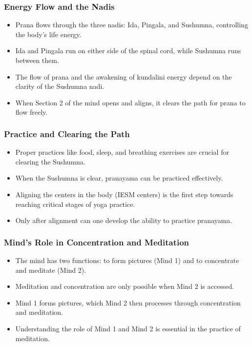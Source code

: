 \begin{frame}[fragile]\frametitle{Energy Flow and the Nadis}
    \begin{itemize}
        \item Prana flows through the three nadis: Ida, Pingala, and Sushumna, controlling the body's life energy.
        \item Ida and Pingala run on either side of the spinal cord, while Sushumna runs between them.
        \item The flow of prana and the awakening of kundalini energy depend on the clarity of the Sushumna nadi.
        \item When Section 2 of the mind opens and aligns, it clears the path for prana to flow freely.
    \end{itemize}
\end{frame}

\begin{frame}[fragile]\frametitle{Practice and Clearing the Path}
    \begin{itemize}
        \item Proper practices like food, sleep, and breathing exercises are crucial for clearing the Sushumna.
        \item When the Sushumna is clear, pranayama can be practiced effectively.
        \item Aligning the centers in the body (IESM centers) is the first step towards reaching critical stages of yoga practice.
        \item Only after alignment can one develop the ability to practice pranayama.
    \end{itemize}
\end{frame}

\begin{frame}[fragile]\frametitle{Mind's Role in Concentration and Meditation}
    \begin{itemize}
        \item The mind has two functions: to form pictures (Mind 1) and to concentrate and meditate (Mind 2).
        \item Meditation and concentration are only possible when Mind 2 is accessed.
        \item Mind 1 forms pictures, which Mind 2 then processes through concentration and meditation.
        \item Understanding the role of Mind 1 and Mind 2 is essential in the practice of meditation.
    \end{itemize}
\end{frame}

